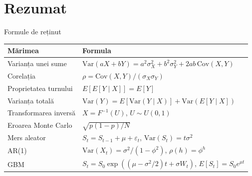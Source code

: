 \section{Rezumat}

\begin{frame}{Formule de reținut}
\itemsize{\small}
\begin{center}
\footnotesize
\begin{tabular}{ll}
\toprule
\textbf{Mărimea} & \textbf{Formula} \\
\midrule
Varianța unei sume & $\text{Var}(aX + bY) = a^2\sigma_X^2 + b^2\sigma_Y^2 + 2ab\,\text{Cov}(X, Y)$ \\
Corelația & $\rho = \text{Cov}(X, Y)/(\sigma_X\sigma_Y)$ \\
Proprietatea turnului & $E[E[Y \mid X]] = E[Y]$ \\
Varianța totală & $\text{Var}(Y) = E[\text{Var}(Y \mid X)] + \text{Var}(E[Y \mid X])$ \\
Transformarea inversă & $X = F^{-1}(U)$, $U \sim U(0, 1)$ \\
Eroarea Monte Carlo & $\sqrt{p(1 - p)/N}$ \\
Mers aleator & $S_t = S_{t-1} + \mu + \varepsilon_t$, $\text{Var}(S_t) = t\sigma^2$ \\
AR(1) & $\text{Var}(X_t) = \sigma^2/(1 - \phi^2)$, $\rho(h) = \phi^h$ \\
GBM & $S_t = S_0\exp((\mu - \sigma^2/2)t + \sigma W_t)$, $E[S_t] = S_0e^{\mu t}$ \\
\bottomrule
\end{tabular}
\end{center}
\end{frame}


